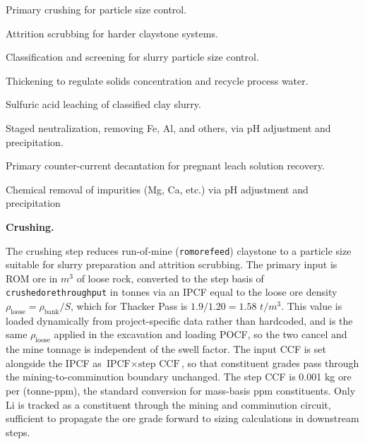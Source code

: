 \documentclass{article}
\renewcommand\_{\textunderscore\allowbreak}
\begin{document}
\begin{description}[noitemsep, topsep=0pt]
    \item[\textbullet\enskip\texttt{Crushing:}] Primary crushing for particle size control.
    \item[\textbullet\enskip\texttt{Attrition Scrubbing:}] Attrition scrubbing for harder claystone systems.
    \item[\textbullet\enskip\texttt{Classification:}] Classification and screening for slurry particle size control.
    \item[\textbullet\enskip\texttt{Thickening:}] Thickening to regulate solids concentration and recycle process water.
    \item[\textbullet\enskip\texttt{Acid Leaching:}] Sulfuric acid leaching of classified clay slurry.
    \item[\textbullet\enskip\texttt{Neutralization:}] Staged neutralization, removing Fe, Al, and others, via pH adjustment and precipitation. 
    \item[\textbullet\enskip\texttt{Multistage Primary Counter-Current Decantation:}] Primary counter-current decantation for pregnant leach solution recovery.
    \item[\textbullet\enskip\texttt{Impurity Removal:}] 
    Chemical removal of impurities (Mg, Ca, etc.) via pH adjustment and precipitation
\end{description}

\medskip
\noindent\textbf{Crushing.}\quad

The crushing step reduces run-of-mine (\texttt{rom\_ore\_feed}) claystone to a particle size suitable for slurry preparation and attrition scrubbing. The primary input is ROM ore in $\si{m^3}$ of loose rock, converted to the step basis of \texttt{crushed\_ore\_throughput} in tonnes via an IPCF equal to the loose ore density $\rho_{\text{loose}} = \rho_{\text{bank}}/S$, which for Thacker Pass is $1.9/1.20 = 1.58$ $\si{t/m^3}$. This value is loaded dynamically from project-specific data rather than hardcoded, and is the same $\rho_{\text{loose}}$ applied in the excavation and loading POCF, so the two cancel and the mine tonnage is independent of the swell factor. The input CCF is set alongside the IPCF as $\text{IPCF} \times \text{step CCF}$, so that constituent grades pass through the mining-to-comminution boundary unchanged. The step CCF is 0.001 kg ore per (tonne-ppm), the standard conversion for mass-basis ppm constituents. Only Li is tracked as a constituent through the mining and comminution circuit, sufficient to propagate the ore grade forward to sizing calculations in downstream steps.
\end{document}

